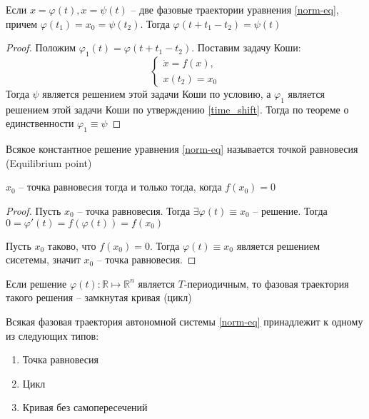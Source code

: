 \documentclass[document.tex]{subfiles}
\begin{document}
\begin{statement}
    \label{periodic}
    Если $x = \varphi(t), x = \psi(t)$ -- две фазовые траектории уравнения \ref{norm-eq}, причем $\varphi(t_1) = x_0 =
    \psi(t_2)$. Тогда $\varphi(t + t_1 - t_2) = \psi(t)$
\end{statement}

\begin{proof}
    Положим $\varphi_1(t) = \varphi(t + t_1 - t_2)$. Поставим задачу Коши:
    \[
        \begin{cases}
            \dot x = f(x), \\
            x(t_2) = x_0
        \end{cases}
    \] Тогда $\psi$ является решением этой задачи Коши по условию, а $\varphi_1$ является решением этой задачи Коши по
    утверждению \ref{time_shift}. Тогда по теореме о единственности $\varphi_1 \equiv \psi$
\end{proof}

\begin{definition}
    Всякое константное решение уравнения \ref{norm-eq} называется точкой равновесия (Equilibrium point)
\end{definition}

\begin{statement}
    $x_0$ -- точка равновесия тогда и только тогда, когда $f(x_0) = 0$
\end{statement}

\begin{proof}
    Пусть $x_0$ -- точка равновесия. Тогда $\exists \varphi(t) \equiv x_0$ -- решение. Тогда 
    $0 = \varphi'(t) = f(\varphi(t)) = f(x_0)$

    Пусть $x_0$ таково, что $f(x_0) = 0$. Тогда $\varphi(t) \equiv x_0$ является решением сисетемы, значит $x_0$ --
    точка равновесия.
\end{proof}

\begin{remark}
    Если решение $\varphi(t) : \mathbb{R} \mapsto \mathbb{R}^n$ является $T$-периодичным, то фазовая траектория такого
    решения -- замкнутая кривая (цикл)
\end{remark}

\begin{theorem}
    Всякая фазовая траектория автономной системы \ref{norm-eq} принадлежит к одному из следующих типов:
    \begin{enumerate}
        \item Точка равновесия
        \item Цикл
        \item Кривая без самопересечений
    \end{enumerate}
\end{theorem}
\end{document}
